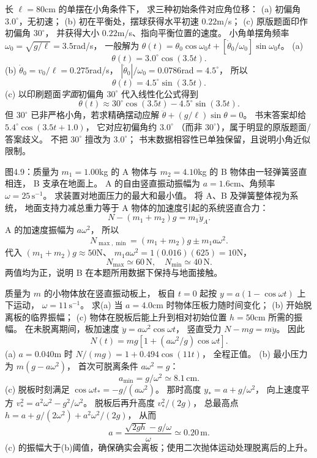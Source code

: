 长 $\ell=80$cm 的单摆在小角条件下，
求三种初始条件对应角位移：
(a) 初偏角 $3.0^\circ$，无初速；
(b) 初在平衡处，摆球获得水平初速 $0.22$m/s；
(c) 原版题面印作初偏角 $30^\circ$，
并获得大小 $0.22$m/s、指向平衡位置的速度。
\exsolution
小角单摆角频率
$\omega_0=\sqrt{g/\ell}=3.5$rad/s，
一般解为
$\theta(t)=\theta_0\cos\omega_0t+
[\dot\theta_0/\omega_0]\sin\omega_0t$。
(a)
\[
\boxed{\theta(t)=3.0^\circ\cos(3.5t)}.
\]
(b) $\dot\theta_0=v_0/\ell=0.275$rad/s，
$|\dot\theta_0|/\omega_0=0.0786$rad$=4.5^\circ$，
所以
\[
\boxed{\theta(t)=4.5^\circ\sin(3.5t)}.
\]
(c) 以印刷题面\emph{字面}初偏角
$30^\circ$ 代入线性化公式得到
\[
\boxed{\theta(t)\approx30^\circ\cos(3.5t)
-4.5^\circ\sin(3.5t)}.
\]
但 $30^\circ$ 已非严格小角，若求精确摆动应解
$\ddot\theta+(g/\ell)\sin\theta=0$。
书末答案却给
$5.4^\circ\cos(3.5t+1.0)$，
它对应初偏角约 $3.0^\circ$
（而非 $30^\circ$），属于明显的原版题面/答案歧义。
\excheck 不把 $30^\circ$ 擅改为 $3.0^\circ$；
书末数据相容性已单独保留，且说明小角近似限制。

图4.9：质量为 $m_1=1.00$kg 的 A 物体与
$m_2=4.10$kg 的 B 物体由一轻弹簧竖直相连，
B 支承在地面上。
A 的自由竖直振动振幅为
$a=1.6$cm、角频率
$\omega=25\,\mathrm{s^{-1}}$。
求装置对地面压力的最大和最小值。
\exsolution
将 A、B 及弹簧整体视为系统，
地面支持力减总重力等于 A 物体的加速度引起的系统竖直合力：
\[
N-(m_1+m_2)g=m_1\ddot y_A.
\]
A 的加速度振幅为 $a\omega^2$，
所以
\[
\boxed{N_{\max,\min}=
(m_1+m_2)g\pm m_1a\omega^2}.
\]
代入
$(m_1+m_2)g\approx50$N、
$m_1a\omega^2=1(0.016)(625)=10$N，
\[
\boxed{N_{\max}\simeq60\,\mathrm N,\quad
N_{\min}\simeq40\,\mathrm N}.
\]
\excheck 两值均为正，说明 B 在本题所用数据下保持与地面接触。

质量为 $m$ 的小物体放在竖直振动板上，
板自 $t=0$ 起按
$y=a(1-\cos\omega t)$ 上下运动，
$\omega=11\,\mathrm{s^{-1}}$。
求(a) 当 $a=4.0$cm 时物体压板力随时间变化；
(b) 开始脱离板的临界振幅；
(c) 物体在脱板后能上升到相对初始位置
$h=50$cm 所需的振幅。
\exsolution
在未脱离期间，板加速度
$\ddot y=a\omega^2\cos\omega t$，
竖直受力
$N-mg=m\ddot y$。
因此
\[
\boxed{N(t)=mg[1+(a\omega^2/g)\cos\omega t]}.
\]
(a) $a=0.040$m 时
$N/(mg)=1+0.494\cos(11t)$，
全程正值。
(b) 最小压力为 $m(g-a\omega^2)$，
首次可脱离条件 $a\omega^2=g$：
\[
\boxed{a_{\min}=g/\omega^2
\simeq8.1\,\mathrm{cm}}.
\]
(c) 脱板时刻满足
$\cos\omega t_*=-g/(a\omega^2)$。
那时高度
$y_*=a+g/\omega^2$，
向上速度平方
$v_*^2=a^2\omega^2-g^2/\omega^2$。
脱板后再升高度
$v_*^2/(2g)$，
总最高点
$h=a+g/(2\omega^2)+a^2\omega^2/(2g)$，
从而
\[
\boxed{a=\frac{\sqrt{2gh}-g/\omega}{\omega}
\simeq0.20\,\mathrm m}.
\]
\excheck (c) 的振幅大于(b)阈值，确保确实会离板；使用二次抛体运动处理脱离后的上升。

